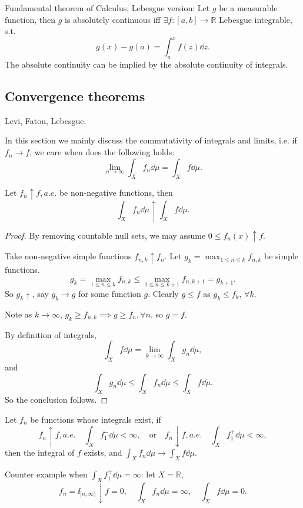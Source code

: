 \begin{example}
    Fundamental theorem of Calculus, Lebesgue version:
	Let $g$ be a measurable function, then $g$ is absolutely continuous
	iff $\exists f: [a,b]\to \mathbb{R}$ Lebesgue integrable, s.t.
	\[
	g(x) - g(a) = \int_a^x f(z)\dd z.
	\]
	The absolute continuity can be implied by the absolute continuity of
	integrals.
\end{example}

\subsection{Convergence theorems}
\label{sub:Convergence theorems}

Levi, Fatou, Lebesgue.

In this section we mainly discuss the commutativity of
integrals and limits, i.e. if $f_n \to f$, we care when does the following holds:
\[
\lim_{n\to \infty} \int_X f_n \dd \mu = \int_X f\dd \mu.
\]

\begin{theorem}
    Let $f_n \uparrow f, a.e.$ be non-negative functions, then
	\[
	\int_X f_n \dd \mu \uparrow \int_X f\dd \mu.
	\]
\end{theorem}
\begin{proof}[Proof]
    By removing countable null sets, we may assume $0 \le f_n(x)\uparrow f$.

	Take non-negative simple functions $f_{n,k}\uparrow f_n$.
	Let $g_k = \max_{1\le n\le k}f_{n, k}$ be simple functions.
	\[
	g_k = \max_{1\le n\le k}f_{n, k}\le \max_{1\le n\le k+1} f_{n, k+1} = g_{k+1}.
	\]
	So $g_k \uparrow$, say $g_k \to g$ for some function $g$.
	Clearly $g\le f$ as $g_k \le f_k$, $\forall k$.

	Note as $k\to \infty$, $g_k \ge f_{n,k}\implies g\ge f_n, \forall n$.
	so $g = f$.

	By definition of integrals,
	\[
	\int_X f\dd \mu = \lim_{k\to \infty} \int_X g_n\dd \mu,
	\]
	and
	\[
	\int_X g_n \dd \mu \le \int_X f_n\dd \mu \le \int_X f\dd \mu.
	\]
	So the conclusion follows.
\end{proof}
\begin{corollary}
    Let $f_n$ be functions whose integrals exist, if
	\[
	f_n \uparrow f, a.e. \quad \int_X f_1^- \dd \mu < \infty,\quad
	\text{or}\quad
	f_n \downarrow f, a.e. \quad \int_X f_1^+ \dd \mu < \infty,
	\]
	then the integral of $f$ exists, and $\int_X f_n \dd \mu \to \int_X f\dd \mu$.
\end{corollary}
\begin{remark}
    Counter example when $\int_X f_1^+ \dd \mu = \infty$: let $X = \mathbb{R}$,
	\[
		f_n = \ii_{[n, \infty)} \downarrow f = 0,\quad
		\int_X f_n \dd \mu = \infty, \quad \int_X f \dd \mu = 0.
	\]
\end{remark}


